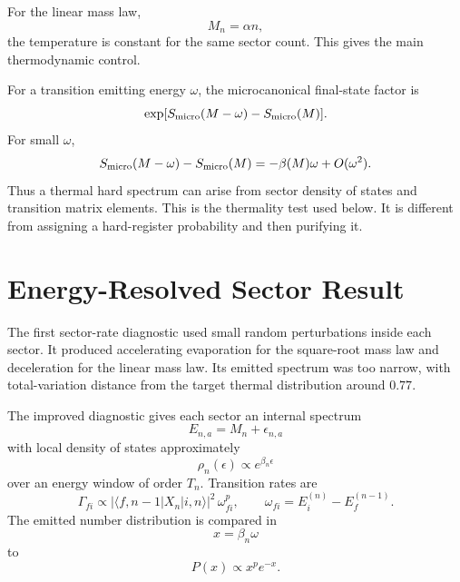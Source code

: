 \documentclass[aps,prd,onecolumn,longbibliography,nofootinbib]{revtex4-2}
\newcommand{\Smicro}{S_{\rm micro}}
\begin{document}
For the linear mass law,
\begin{equation}
    M_n=\alpha n ,
\end{equation}
the temperature is constant for the same sector count.  This gives the main
thermodynamic control.

For a transition emitting energy $\omega$, the microcanonical final-state
factor is
\begin{equation}
    \exp[\Smicro(M-\omega)-\Smicro(M)].
\end{equation}
For small $\omega$,
\begin{equation}
    \Smicro(M-\omega)-\Smicro(M)
    =
    -\beta(M)\omega+O(\omega^2).
\end{equation}
Thus a thermal hard spectrum can arise from sector density of states and
transition matrix elements.  This is the thermality test used below.  It is
different from assigning a hard-register probability and then purifying it.

\section{Energy-Resolved Sector Result}
\label{sec:energy}

The first sector-rate diagnostic used small random perturbations inside each
sector.  It produced accelerating evaporation for the square-root mass law and
deceleration for the linear mass law.  Its emitted spectrum was too narrow,
with total-variation distance from the target thermal distribution around
$0.77$.

The improved diagnostic gives each sector an internal spectrum
\begin{equation}
    E_{n,a}=M_n+\epsilon_{n,a}
\end{equation}
with local density of states approximately
\begin{equation}
    \rho_n(\epsilon)\propto e^{\beta_n\epsilon}
\end{equation}
over an energy window of order $T_n$.  Transition rates are
\begin{equation}
    \Gamma_{fi}\propto
    |\langle f,n-1|X_n|i,n\rangle|^2\,\omega_{fi}^{p},
    \qquad
    \omega_{fi}=E_i^{(n)}-E_f^{(n-1)}.
\end{equation}
The emitted number distribution is compared in
\begin{equation}
    x=\beta_n\omega
\end{equation}
to
\begin{equation}
    P(x)\propto x^p e^{-x}.
\end{equation}
\end{document}
